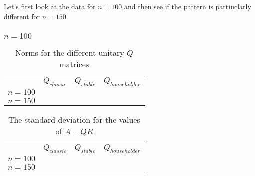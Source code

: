 \documentclass[a4paper,11pt]{article}
\begin{document}
Let's first look at the data for $n=100$ and then see if
the pattern is partiuclarly different for $n=150$.

\subsubsection{$n=100$}
\begin{table}[h]
  \begin{tabular}{r|c|c|c|}
    \multicolumn{1}{r}{}
     & \multicolumn{1}{c}{$Q_{classic}$ }
     & \multicolumn{1}{c}{$Q_{stable}$}
     & \multicolumn{1}{c}{$Q_{householder}$} \\
    \cline{2-4}
    $n=100$ & 
            & 
            & 
            \\ \cline{2-4}
    $n=150$ & 
            & 
            & 
            \\ \cline{2-4}
  \end{tabular}
  \caption{Norms for the different unitary $Q$ matrices}
  \label{tab:norms}
\end{table}

\begin{table}[h]
  \begin{tabular}{r|c|c|c|}
    \multicolumn{1}{r}{}
     & \multicolumn{1}{c}{$Q_{classic}$ }
     & \multicolumn{1}{c}{$Q_{stable}$}
     & \multicolumn{1}{c}{$Q_{householder}$} \\
    \cline{2-4}
    $n=100$ & 
            & 
            & 
            \\ \cline{2-4}
    $n=150$ & 
            & 
            & 
            \\ \cline{2-4}
  \end{tabular}
  \caption{The standard deviation for the values of $A-QR$}
  \label{tab:stds}
\end{table}

\newcommand{\genfig}[3] {{
    \begin{figure}
            \centering
            \begin{subfigure}[b]{1.0\textwidth}
                    \texttt{[image: fig/\#1-\#2-100]}
                    \caption{$n = 100$}
            \end{subfigure}
            \begin{subfigure}[b]{1.0\textwidth}
                    \texttt{[image: fig/\#1-\#2-150]}
                    \caption{$n = 150$}
            \end{subfigure}
            \caption{Medians of the columns of $\Delta #2$ #3}\label{fig:#1}
    \end{figure}
  }}
\end{document}
